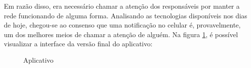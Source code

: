 Em razão disso, era necessário chamar a atenção dos responsáveis por manter a rede funcionando de alguma forma. Analisando as tecnologias disponíveis nos dias de hoje, chegou-se ao consenso que uma notificação no celular é, provavelmente, um dos melhores meios de chamar a atenção de alguém. Na figura \ref{fig:aplicativo}, é possível visualizar a interface da versão final do aplicativo:

\begin{figure}[!htb]
    \centering
    \caption{Aplicativo}
    \label{fig:aplicativo}
\end{figure}